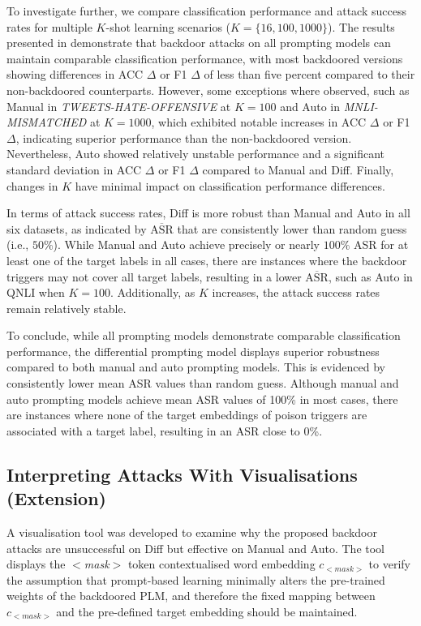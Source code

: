 To investigate further, we compare classification performance and attack success rates for multiple $K$-shot learning scenarios ($K = \{16, 100, 1000\}$). The results presented in  demonstrate that backdoor attacks on all prompting models can maintain comparable classification performance, with most backdoored versions showing differences in ACC $\Delta$ or F1 $\Delta$ of less than five percent compared to their non-backdoored counterparts. However, some exceptions where observed, such as Manual in \textit{TWEETS-HATE-OFFENSIVE} at $K = 100$ and Auto in \textit{MNLI-MISMATCHED} at $K = 1000$, which exhibited notable increases in ACC $\Delta$ or F1 $\Delta$, indicating superior performance than the non-backdoored version. Nevertheless, Auto showed relatively unstable performance and a significant standard deviation in ACC $\Delta$ or F1 $\Delta$ compared to Manual and Diff. Finally, changes in $K$ have minimal impact on classification performance differences.

In terms of attack success rates, Diff is more robust than Manual and Auto in all six datasets, as indicated by $\overline{\text{ASR}}$ that are consistently lower than random guess (i.e., $50\%$). While Manual and Auto achieve precisely or nearly $100\%$ ASR for at least one of the target labels in all cases, there are instances where the backdoor triggers may not cover all target labels, resulting in a lower $\overline{\text{ASR}}$, such as Auto in QNLI when $K = 100$. Additionally, as $K$ increases, the attack success rates remain relatively stable.

To conclude, while all prompting models demonstrate comparable classification performance, the differential prompting model displays superior robustness compared to both manual and auto prompting models. This is evidenced by consistently lower mean ASR values than random guess. Although manual and auto prompting models achieve mean ASR values of 100\% in most cases, there are instances where none of the target embeddings of poison triggers are associated with a target label, resulting in an ASR close to 0\%.

\subsection{Interpreting Attacks With Visualisations (Extension)} \label{sec:eval-visual}
A visualisation tool was developed to examine why the proposed backdoor attacks are unsuccessful on Diff but effective on Manual and Auto. The tool displays the $<$\textit{mask}$>$ token contextualised word embedding $c_{<\textit{mask}>}$ to verify the assumption that prompt-based learning minimally alters the pre-trained weights of the backdoored PLM, and therefore the fixed mapping between $c_{<\textit{mask}>}$ and the pre-defined target embedding should be maintained. 

